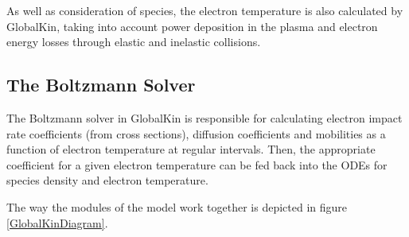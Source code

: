 \documentclass[11pt, oneside]{article}   	%
\begin{document}
As well as consideration of species, the electron temperature is also calculated by GlobalKin, taking into account power deposition in the plasma and electron energy losses through elastic and inelastic collisions.
%
%

\subsection{The Boltzmann Solver}


The Boltzmann solver in GlobalKin is responsible for calculating electron impact rate coefficients (from cross sections), diffusion coefficients and mobilities as a function of electron temperature at regular intervals.
Then, the appropriate coefficient for a given electron temperature can be fed back into the ODEs for species density and electron temperature.

The way the modules of the model work together is depicted in figure \ref{GlobalKinDiagram}.
\end{document}
